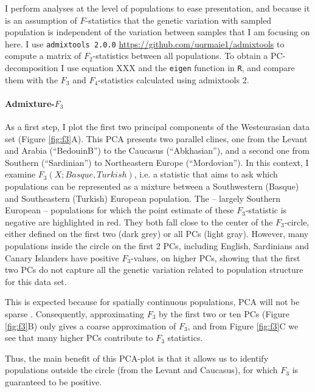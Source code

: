 \documentclass[12pt,a4pape, fullpage]{article}
\begin{document}
I perform analyses at the level of populations to ease presentation, and because it is an assumption of $F$-statistics that the genetic variation with sampled population is independent of the variation between samples that I am focusing on here. I use \texttt{admixtools 2.0.0} \url{https://github.com/uqrmaie1/admixtools} to compute a matrix of $F_2$-statistics between all populations. To obtain a PC-decomposition I use equation XXX and the \texttt{eigen} function in \texttt{R}, and compare them with the $F_3$ and $F_4$-statistics calculated using admixtools 2.

\paragraph{Admixture-$F_3$}
As a first step, I plot the first two principal components of the Westeurasian data set (Figure \ref{fig:f3}A). This PCA presents two parallel clines, one from the Levant and Arabia (``BedouinB'') to the Caucasus (``Abkhasian''), and a second one from Southern (``Sardinian'') to Northeastern Europe (``Mordovian''). In this context, I examine $F_3(X; Basque, Turkish)$, i.e. a statistic that aims to ask which populations can be represented as a mixture between a Southwestern (Basque) and Southeastern (Turkish) European population. The -- largely Southern European -- populations for which the point estimate of these $F_3$-statistic is negative are highlighted in red. They both fall close to the center of the $F_3$-circle, either defined on the first two (dark grey) or all PCs (light gray). However, many populations inside the circle on the first 2 PCs, including English, Sardinians and Canary Islanders have positive $F_3$-values, on higher PCs, showing that the first two PCs do not capture all the genetic variation related to population structure for this data set. 

This is expected because for spatially continuous populations, PCA will not be sparse \cite{novembre2008a}.  Consequently, approximating $F_3$ by the first two or ten PCs (Figure \ref{fig:f3}B) only gives a coarse approximation of $F_3$, and from Figure \ref{fig:f3}C we see that many higher PCs contribute to $F_3$ statistics.

Thus, the main benefit of this PCA-plot is that it allows us to identify populations outside the circle (from the Levant and Caucasus), for which $F_3$ is guaranteed to be positive.
\end{document}
